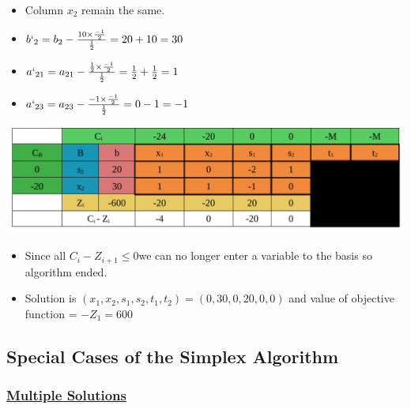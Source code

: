 \vspace{0.25cm}
\begin{itemize}
 \item Column \(x_2\) remain the same.
 \item \(b`_{2} = b_{2} - \frac{10\times\frac{-1}{2}}{\frac{1}{2}} = 20 + 10  = 30\)
 \item \(a`_{21} = a_{21} - \frac{\frac{1}{2}\times\frac{-1}{2}}{\frac{1}{2}} = \frac{1}{2} + \frac{1}{2}  = 1\)
 \item \(a`_{23} = a_{23} - \frac{-1\times\frac{-1}{2}}{\frac{1}{2}} = 0 - 1  = -1\)
\end{itemize}

\vspace{0.25cm}


\begin{center}
    \includegraphics{Chapters/Simplexe/EX/EX3/ex3.5.pdf}
\end{center}

\vspace{0.25cm}

\begin{itemize}
    \item Since all \hspace{0.2cm}\(C_i - Z_{i+1} \leq 0\)\hspace{0.2cm}we can no longer enter a variable to the basis so algorithm ended.
    \item Solution is \((x_1,x_2,s_1,s_2,t_1,t_2) = (0,30,0,20,0,0)\) and value of objective function = \(-Z_1 = 600\)
\end{itemize}

\vspace{0.25cm}

\subsection{Special Cases of the Simplex Algorithm}

\subsubsection*{\underline{Multiple Solutions}}

